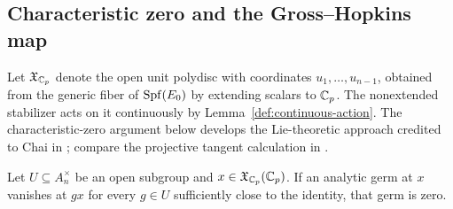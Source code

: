 \subsection{Characteristic zero and the Gross--Hopkins map}

Let \(\mathfrak X_{\mathbb C_p}\) denote the open unit polydisc with coordinates
\(u_1,\ldots,u_{n-1}\), obtained from the generic fiber of
\(\operatorname{Spf}(E_0)\) by extending scalars to \(\mathbb C_p\).
The nonextended stabilizer acts on it continuously by
Lemma~\ref{def:continuous-action}.  The characteristic-zero argument
below develops the Lie-theoretic approach credited to Chai in
\cite[Remark~4.2]{BHN22}; compare the projective tangent calculation in
\cite[Proposition~4.18]{BHN22}.

\begin{proposition}\label{fin:charzero}
Let \(U\subseteq A_n^\times\) be an open subgroup and
\(x\in\mathfrak X_{\mathbb C_p}(\mathbb C_p)\).
If an analytic germ at \(x\) vanishes at \(g x\) for every
\(g\in U\) sufficiently close to the identity, that germ is zero.
\end{proposition}

